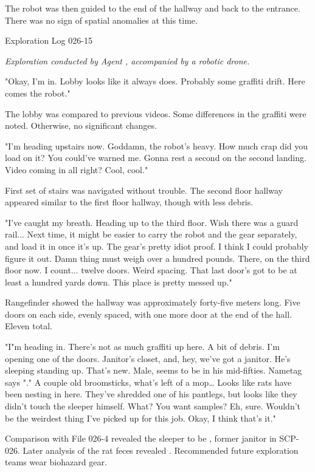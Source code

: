 The robot was then guided to the end of the hallway and back to the entrance. There was no sign of spatial anomalies at this time.
\bigskip
\begin{flushleft}
Exploration Log 026-15
\end{flushleft}
\textsl{Exploration conducted by Agent , accompanied by a robotic drone.}

"Okay, I'm in. Lobby looks like it always does. Probably some graffiti drift. Here comes the robot."

The lobby was compared to previous videos. Some differences in the graffiti were noted. Otherwise, no significant changes.

"I'm heading upstairs now. Goddamn, the robot's heavy. How much crap did you load on it? You could've warned me. Gonna rest a second on the second landing. Video coming in all right? Cool, cool."

First set of stairs was navigated without trouble. The second floor hallway appeared similar to the first floor hallway, though with less debris.

"I've caught my breath. Heading up to the third floor. Wish there was a guard rail... Next time, it might be easier to carry the robot and the gear separately, and load it in once it's up. The gear's pretty idiot proof. I think I could probably figure it out. Damn thing must weigh over a hundred pounds. There, on the third floor now. I count... twelve doors. Weird spacing. That last door's got to be at least a hundred yards down. This place is pretty messed up."

Rangefinder showed the hallway was approximately forty-five meters long. Five doors on each side, evenly spaced, with one more door at the end of the hall. Eleven total.

"I"m heading in. There's not as much graffiti up here. A bit of debris. I'm opening one of the doors. Janitor's closet, and, hey, we've got a janitor. He's sleeping standing up. That's new. Male, seems to be in his mid-fifties. Nametag says "." A couple old broomsticks, what's left of a mop… Looks like rats have been nesting in here. They've shredded one of his pantlegs, but looks like they didn't touch the sleeper himself. What? You want samples? Eh, sure. Wouldn't be the weirdest thing I've picked up for this job. Okay, I think that's it."

Comparison with File 026-4 revealed the sleeper to be  , former janitor in SCP-026. Later analysis of the rat feces revealed \redacted. Recommended future exploration teams wear biohazard gear.

